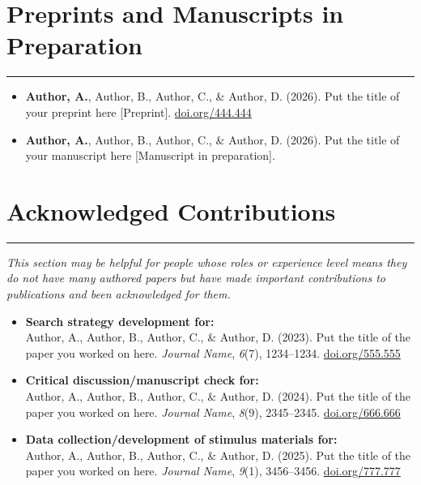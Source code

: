 \documentclass{article}
\begin{document}
\section*{Preprints and Manuscripts in Preparation}
\hrule
\vspace{1em}

\begin{itemize}[leftmargin=*]
    \item[] \noindent
    \textbf{Author, A.}, Author, B., Author, C., \& Author, D. (2026). Put the title of your preprint here [Preprint]. \href{https://doi.org}{doi.org/444.444}

    \item[] \noindent
    \textbf{Author, A.}, Author, B., Author, C., \& Author, D. (2026). Put the title of your manuscript here [Manuscript in preparation].
\end{itemize}

\section*{Acknowledged Contributions}
\hrule
\vspace{1em}
\textit{This section may be helpful for people whose roles or experience level means they do not have many authored papers but have made important contributions to publications and been acknowledged for them.}

\begin{itemize}[leftmargin=*]
    \item[] \noindent
    \textbf{Search strategy development for:}\\
    Author, A., Author, B., Author, C., \& Author, D. (2023). Put the title of the paper you worked on here. \textit{Journal Name}, \textit{6}(7), 1234--1234. \href{https://doi.org}{doi.org/555.555}

    \item[] \noindent
    \textbf{Critical discussion/manuscript check for:}\\
    Author, A., Author, B., Author, C., \& Author, D. (2024). Put the title of the paper you worked on here. \textit{Journal Name}, \textit{8}(9), 2345--2345. \href{https://doi.org}{doi.org/666.666}

    \item[] \noindent
    \textbf{Data collection/development of stimulus materials for:}\\
    Author, A., Author, B., Author, C., \& Author, D. (2025). Put the title of the paper you worked on here. \textit{Journal Name}, \textit{9}(1), 3456--3456. \href{https://doi.org}{doi.org/777.777}
\end{itemize}
\end{document}
